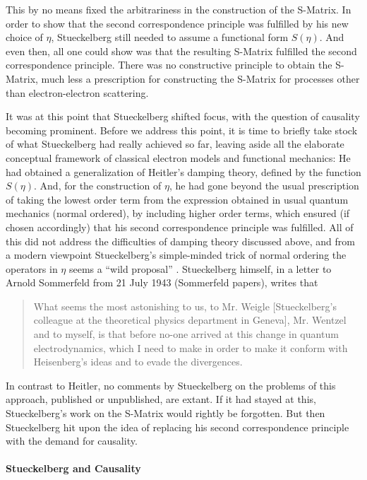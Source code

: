 \documentclass[12pt]{article}
\begin{document}
This by no means fixed the arbitrariness in the construction of the S-Matrix. In order to show that the second correspondence principle was fulfilled by his new choice of $\eta$, Stueckelberg still needed to assume a functional form $S(\eta)$. And even then, all one could show was that the resulting S-Matrix fulfilled the second correspondence principle. There was no constructive principle to obtain the S-Matrix, much less a prescription for constructing the S-Matrix for processes other than electron-electron scattering.

It was at this point that Stueckelberg shifted focus, with the question of causality becoming prominent. Before we address this point, it is time to briefly take stock of what Stueckelberg had really achieved so far, leaving aside all the elaborate conceptual framework of classical electron models and functional mechanics: He had obtained a generalization of Heitler's damping theory, defined by the function $S(\eta)$. And, for the construction of $\eta$, he had gone beyond the usual prescription of taking the lowest order term from the expression obtained in usual quantum mechanics (normal ordered), by including higher order terms, which ensured (if chosen accordingly) that his second correspondence principle was fulfilled. All of this did not address the difficulties of damping theory discussed above, and from a modern viewpoint Stueckelberg's simple-minded trick of normal ordering the operators in $\eta$ seems a ``wild proposal'' \citep[p. 96]{wanders_2009_stueckelberg}. Stueckelberg himself, in a letter to Arnold Sommerfeld from 21 July 1943 (Sommerfeld papers), writes that

\begin{quote}
What seems the most astonishing to us, to Mr. Weigle [Stueckelberg's colleague at the theoretical physics department in Geneva], Mr. Wentzel and to myself, is that before no-one arrived at this change in quantum electrodynamics, which I need to make in order to make it conform with Heisenberg's ideas and to evade the divergences.
\end{quote}

In contrast to Heitler, no comments by Stueckelberg on the problems of this approach, published or unpublished, are extant. If it had stayed at this, Stueckelberg's work on the S-Matrix would rightly be forgotten. But then Stueckelberg hit upon the idea of replacing his second correspondence principle with the demand for causality.

\paragraph{Stueckelberg and Causality}
\end{document}
